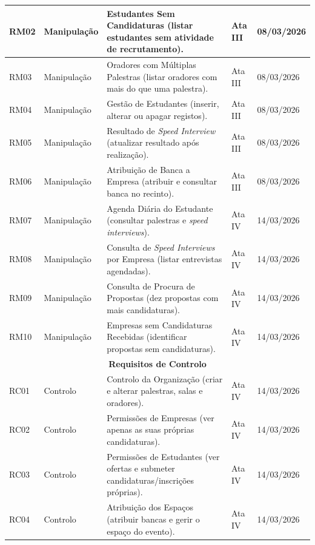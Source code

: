 \documentclass[12pt,a4paper]{article}
\begin{document}
\begin{table}[H]
\begin{tabular}{|l|l|p{5.5cm}|l|l|}
        \hline
        RM02 & Manipulação & Estudantes Sem Candidaturas (listar estudantes sem atividade de recrutamento). & Ata III & 08/03/2026 \\
        \hline
        RM03 & Manipulação & Oradores com Múltiplas Palestras (listar oradores com mais do que uma palestra). & Ata III & 08/03/2026 \\
        \hline
        RM04 & Manipulação & Gestão de Estudantes (inserir, alterar ou apagar registos). & Ata III & 08/03/2026 \\
        \hline
        RM05 & Manipulação & Resultado de \textit{Speed Interview} (atualizar resultado após realização). & Ata III & 08/03/2026 \\
        \hline
        RM06 & Manipulação & Atribuição de Banca a Empresa (atribuir e consultar banca no recinto). & Ata III & 08/03/2026 \\
        \hline
        RM07 & Manipulação & Agenda Diária do Estudante (consultar palestras e \textit{speed interviews}). & Ata IV & 14/03/2026 \\
        \hline
        RM08 & Manipulação & Consulta de \textit{Speed Interviews} por Empresa (listar entrevistas agendadas). & Ata IV & 14/03/2026 \\
        \hline
        RM09 & Manipulação & Consulta de Procura de Propostas (dez propostas com mais candidaturas). & Ata IV & 14/03/2026 \\
        \hline
        RM10 & Manipulação & Empresas sem Candidaturas Recebidas (identificar propostas sem candidaturas). & Ata IV & 14/03/2026 \\
        \hline
        \multicolumn{5}{|c|}{\textbf{Requisitos de Controlo}} \\
        \hline
        RC01 & Controlo & Controlo da Organização (criar e alterar palestras, salas e oradores). & Ata IV & 14/03/2026 \\
        \hline
        RC02 & Controlo & Permissões de Empresas (ver apenas as suas próprias candidaturas). & Ata IV & 14/03/2026 \\
        \hline
        RC03 & Controlo & Permissões de Estudantes (ver ofertas e submeter candidaturas/inscrições próprias). & Ata IV & 14/03/2026 \\
        \hline
        RC04 & Controlo & Atribuição dos Espaços (atribuir bancas e gerir o espaço do evento). & Ata IV & 14/03/2026 \\
        \hline
    \end{tabular}
\end{table}
\end{document}

